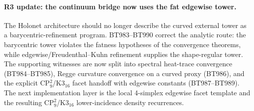 \paragraph{R3 update: the continuum bridge now uses the fat edgewise tower.}
The Holonet architecture should no longer describe the curved external tower as
a barycentric-refinement program.  BT983--BT990 correct the analytic route: the
barycentric tower violates the fatness hypotheses of the convergence theorems,
while edgewise/Freudenthal--Kuhn refinement supplies the shape-regular tower.
The supporting witnesses are now split into spectral heat-trace convergence
(BT984--BT985), Regge curvature convergence on a curved proxy (BT986), and the
explicit CP\(^2_9\)/K3\(_{16}\) facet handoff with edgewise constants
(BT987--BT989).  The next implementation layer is the local 4-simplex edgewise
facet template and the resulting CP\(^2_9\)/K3\(_{16}\) lower-incidence density
recurrences.
